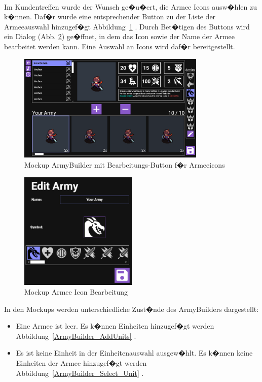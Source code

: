\documentclass[12pt, titlepage]{scrartcl}
\newcommand{\Abb}[1]{%
	Abbildung\ \ref{#1}%
}
\begin{document}
		\ \\Im Kundentreffen wurde der Wunsch ge�u�ert, die Armee Icons ausw�hlen zu k�nnen. Daf�r wurde eine entsprechender Button zu der Liste der Armeeauswahl hinzugef�gt \Abb{ArmyBuilder_EditButton}. Durch Bet�tigen des Buttons wird ein Dialog (Abb. \ref{AmryEditor}) ge�ffnet, in dem das Icon sowie der Name der Armee bearbeitet werden kann. Eine Auswahl an Icons wird daf�r bereitgestellt.
		\begin{figure}[H] 
			\centering
			\includegraphics[width=0.8\textwidth]{ArmyBuilder_Save_Edit.png}
			\caption{Mockup ArmyBuilder mit \glqq Bearbeitungs\grqq-Button f�r Armeeicons}
			\label{ArmyBuilder_EditButton}
		\end{figure}
		\begin{figure}[H] 
			\centering
			\includegraphics[width=0.5\textwidth]{ArmyEditor.png}
			\caption{Mockup Armee Icon Bearbeitung}
			\label{AmryEditor}
		\end{figure}
		In den Mockups werden unterschiedliche Zust�nde des ArmyBuilders dargestellt:
		\begin{itemize}
			\item Eine Armee ist leer. Es k�nnen Einheiten hinzugef�gt werden \Abb{ArmyBuilder_AddUnits}.
			\item Es ist keine Einheit in der Einheitenauswahl ausgew�hlt. Es k�nnen keine Einheiten der Armee hinzugef�gt werden \Abb{ArmyBuilder_Select_Unit}. 
		\end{itemize}
\end{document}
